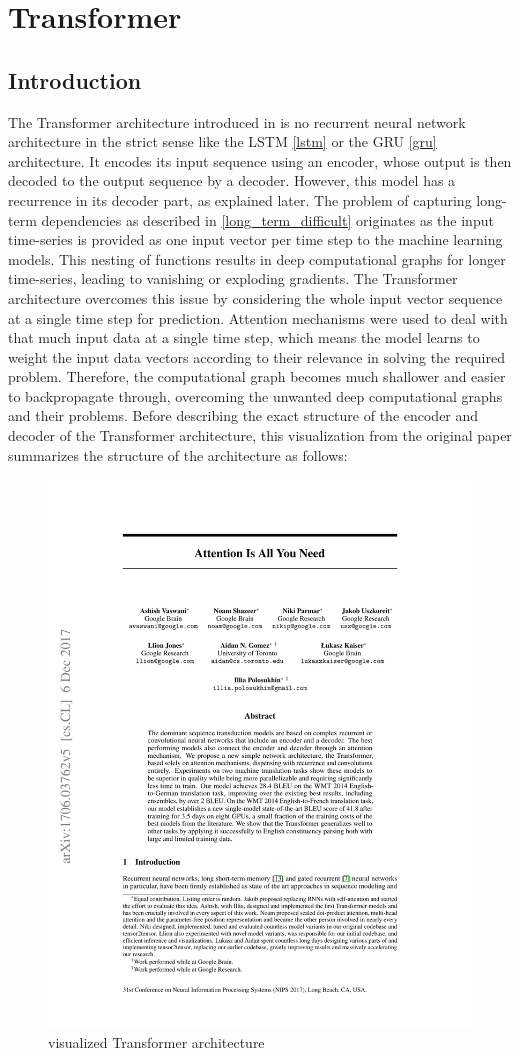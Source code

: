 \documentclass[draft,final]{vutinfth} %
\begin{document}
\section{Transformer} \label{transformer}

\subsection{Introduction}
The Transformer architecture introduced in \cite{Transformer} is no recurrent neural network architecture in the strict sense like the LSTM \ref{lstm} or the GRU \ref{gru} architecture.
It encodes its input sequence using an encoder, whose output is then decoded to the output sequence by a decoder.
However, this model has a recurrence in its decoder part, as explained later.
The problem of capturing long-term dependencies as described in \ref{long_term_difficult} originates as the input time-series is provided as one input vector per time step to the machine learning models.
This nesting of functions results in deep computational graphs for longer time-series, leading to vanishing or exploding gradients.
The Transformer architecture overcomes this issue by considering the whole input vector sequence at a single time step for prediction.
Attention mechanisms were used to deal with that much input data at a single time step, which means the model learns to weight the input data vectors according to their relevance in solving the required problem.
Therefore, the computational graph becomes much shallower and easier to backpropagate through, overcoming the unwanted deep computational graphs and their problems.
Before describing the exact structure of the encoder and decoder of the Transformer architecture, this visualization from the original paper summarizes the structure of the architecture as follows:
\begin{figure}[H]
\centering{}
\includegraphics[page=3,width=0.6\linewidth,trim={196 398 196 71},clip]{literature/attention_is_all_you_need.pdf}
\caption{visualized Transformer architecture \cite[p. 3]{Transformer}}
\label{fig:transformer_vis}
\end{figure}
\end{document}
